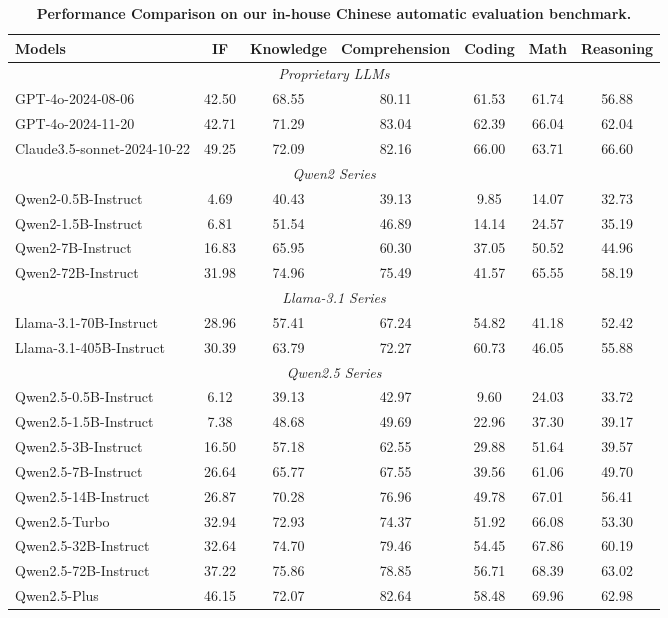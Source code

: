 \documentclass{article}
\begin{document}
\begin{table}[tbp]
\centering
\small
\caption{\textbf{Performance Comparison on our in-house Chinese automatic evaluation benchmark.} }
\label{tab:eval_v11_ZH}
\begin{tabular}{@{}lcccccc@{}}
\toprule
\textbf{Models} & \textbf{IF} & \textbf{Knowledge} & \textbf{Comprehension} & \textbf{Coding} & \textbf{Math} & \textbf{Reasoning} \\
\midrule
\multicolumn{7}{c}{\textit{Proprietary LLMs}} \\
\midrule
GPT-4o-2024-08-06 & 42.50 & 68.55 & 80.11 & 61.53 & 61.74 & 56.88 \\
GPT-4o-2024-11-20 & 42.71 & 71.29 & 83.04 & 62.39 & 66.04 & 62.04 \\
Claude3.5-sonnet-2024-10-22 & 49.25 & 72.09 & 82.16 & 66.00 & 63.71 & 66.60\\
\midrule
\multicolumn{7}{c}{\textit{Qwen2 Series}} \\
\midrule
Qwen2-0.5B-Instruct & 4.69 & 40.43 & 39.13 & 9.85 & 14.07 & 32.73 \\
Qwen2-1.5B-Instruct & 6.81 & 51.54 & 46.89 & 14.14 & 24.57 & 35.19 \\
Qwen2-7B-Instruct & 16.83 & 65.95 & 60.30 & 37.05 & 50.52 & 44.96 \\
Qwen2-72B-Instruct & 31.98 & 74.96 & 75.49 & 41.57 & 65.55 & 58.19 \\
\midrule
\multicolumn{7}{c}{\textit{Llama-3.1 Series}} \\
\midrule
Llama-3.1-70B-Instruct & 28.96 & 57.41 & 67.24 & 54.82 & 41.18 & 52.42 \\
Llama-3.1-405B-Instruct & 30.39 & 63.79 & 72.27 & 60.73 & 46.05 & 55.88\\
\midrule
\multicolumn{7}{c}{\textit{Qwen2.5 Series}} \\
\midrule
Qwen2.5-0.5B-Instruct & 6.12 & 39.13 & 42.97 & 9.60 & 24.03 & 33.72 \\
Qwen2.5-1.5B-Instruct & 7.38 & 48.68 & 49.69 & 22.96 & 37.30 & 39.17 \\
Qwen2.5-3B-Instruct & 16.50 & 57.18 & 62.55 & 29.88 & 51.64 & 39.57 \\
Qwen2.5-7B-Instruct & 26.64 & 65.77 & 67.55 & 39.56 & 61.06 & 49.70 \\
Qwen2.5-14B-Instruct & 26.87 & 70.28 & 76.96 & 49.78 & 67.01 & 56.41 \\
Qwen2.5-Turbo        & 32.94 & 72.93 & 74.37 & 51.92 & 66.08 & 53.30 \\
Qwen2.5-32B-Instruct & 32.64 & 74.70 & 79.46 & 54.45 & 67.86 & 60.19 \\
Qwen2.5-72B-Instruct & 37.22 & 75.86 & 78.85 & 56.71 & 68.39 & 63.02 \\
Qwen2.5-Plus         & 46.15 & 72.07 & 82.64 & 58.48 & 69.96 & 62.98 \\
\bottomrule
\end{tabular}
\end{table}
\end{document}

